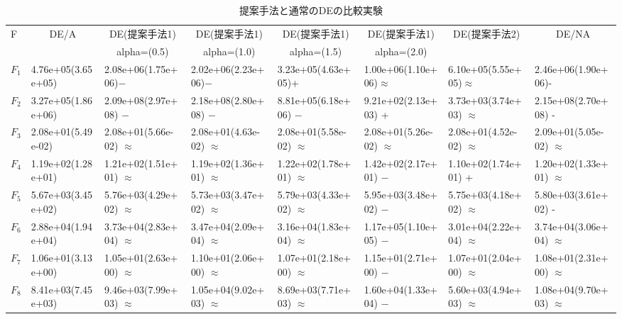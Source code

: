 \documentclass[a4paper,11pt,oneside,openany]{jsbook}
\begin{document}
\begin{landscape}

\begin{table}[!tbp]
\footnotesize
\caption{提案手法と通常のDEの比較実験\label{ref-tb-values}} 
\begin{center}
\begin{tabular}{llllllll}
\hline\hline
\multicolumn{1}{l}{F}&\multicolumn{1}{c}{DE/A}&\multicolumn{1}{c}{DE(提案手法1)}&\multicolumn{1}{c}{DE(提案手法1)}&\multicolumn{1}{c}{DE(提案手法1)}&\multicolumn{1}{c}{DE(提案手法1)}&\multicolumn{1}{c}{DE(提案手法2)}&\multicolumn{1}{c}{DE/NA}\tabularnewline
&&\multicolumn{1}{c}{{\scriptsize alpha=(0.5)}}&\multicolumn{1}{c}{{\scriptsize alpha=(1.0)}}&\multicolumn{1}{c}{{\scriptsize alpha=(1.5)}}&\multicolumn{1}{c}{{\scriptsize alpha=(2.0)}}&&\tabularnewline
\hline
$F_{1}$&4.76e+05(3.65e+05)&2.08e+06(1.75e+06)−&2.02e+06(2.23e+06)−&3.23e+05(4.63e+05)+&1.00e+06(1.10e+06)$\approx$&6.10e+05(5.55e+05)$\approx$&2.46e+06(1.90e+06)-\tabularnewline
$F_{2}$&3.27e+05(1.86e+06)&2.09e+08(2.97e+08) −&2.18e+08(2.80e+08) −&8.81e+05(6.18e+06) −&9.21e+02(2.13e+03) +&3.73e+03(3.74e+03) $\approx$&2.15e+08(2.70e+08) -\tabularnewline
$F_{3}$&2.08e+01(5.49e-02)&2.08e+01(5.66e-02) $\approx$&2.08e+01(4.63e-02) $\approx$&2.08e+01(5.58e-02) $\approx$&2.08e+01(5.26e-02) $\approx$&2.08e+01(4.52e-02) $\approx$&2.09e+01(5.05e-02) $\approx$\tabularnewline
$F_{4}$&1.19e+02(1.28e+01)&1.21e+02(1.51e+01) $\approx$&1.19e+02(1.36e+01) $\approx$&1.22e+02(1.78e+01) $\approx$&1.42e+02(2.17e+01) −&1.10e+02(1.74e+01) +&1.20e+02(1.33e+01) $\approx$\tabularnewline
$F_{5}$&5.67e+03(3.45e+02)&5.76e+03(4.29e+02) $\approx$&5.73e+03(3.47e+02) $\approx$&5.79e+03(4.33e+02) $\approx$&5.95e+03(3.48e+02) −&5.75e+03(4.18e+02) $\approx$&5.80e+03(3.61e+02) -\tabularnewline
$F_{6}$&2.88e+04(1.94e+04)&3.73e+04(2.83e+04) $\approx$&3.47e+04(2.09e+04) $\approx$&3.16e+04(1.83e+04) $\approx$&1.17e+05(1.10e+05) −&3.01e+04(2.22e+04) $\approx$&3.74e+04(3.06e+04) $\approx$\tabularnewline
$F_{7}$&1.06e+01(3.13e+00)&1.05e+01(2.63e+00) $\approx$&1.10e+01(2.06e+00) $\approx$&1.07e+01(2.18e+00) $\approx$&1.15e+01(2.71e+00) −&1.07e+01(2.04e+00) $\approx$&1.08e+01(2.31e+00) $\approx$\tabularnewline
$F_{8}$&8.41e+03(7.45e+03)&9.46e+03(7.99e+03) $\approx$&1.05e+04(9.02e+03) $\approx$&8.69e+03(7.71e+03) $\approx$&1.60e+04(1.33e+04) −&5.60e+03(4.94e+03) $\approx$&1.08e+04(9.70e+03) $\approx$\tabularnewline

\end{tabular}
\end{center}
\end{table}
\end{landscape}
\end{document}
